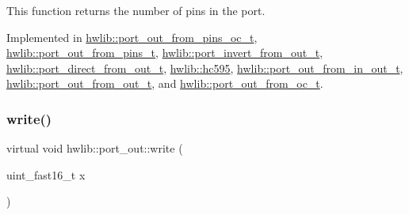 This function returns the number of pins in the port. 

Implemented in \hyperlink{classhwlib_1_1port__out__from__pins__oc__t_adcf78d299959f17d7515f7290206df12}{hwlib\+::port\+\_\+out\+\_\+from\+\_\+pins\+\_\+oc\+\_\+t}, \hyperlink{classhwlib_1_1port__out__from__pins__t_a781f5e1b62a7489f4e048b7314d84ab6}{hwlib\+::port\+\_\+out\+\_\+from\+\_\+pins\+\_\+t}, \hyperlink{classhwlib_1_1port__invert__from__out__t_af0b7be0e09f227190f2cee9c6f43120d}{hwlib\+::port\+\_\+invert\+\_\+from\+\_\+out\+\_\+t}, \hyperlink{classhwlib_1_1port__direct__from__out__t_a3204fe9520fd12fcb155362e22629443}{hwlib\+::port\+\_\+direct\+\_\+from\+\_\+out\+\_\+t}, \hyperlink{classhwlib_1_1hc595_a89c7b21cb99d61c91f764a0fdb7ceb9b}{hwlib\+::hc595}, \hyperlink{classhwlib_1_1port__out__from__in__out__t_a0daa8725e2de27b9071505fa198b4b78}{hwlib\+::port\+\_\+out\+\_\+from\+\_\+in\+\_\+out\+\_\+t}, \hyperlink{classhwlib_1_1port__out__from__out__t_a6e8205f2537103897083612c6d5f35a9}{hwlib\+::port\+\_\+out\+\_\+from\+\_\+out\+\_\+t}, and \hyperlink{classhwlib_1_1port__out__from__oc__t_a25961246ca2c7433fc7534d479a58537}{hwlib\+::port\+\_\+out\+\_\+from\+\_\+oc\+\_\+t}.

\mbox{\label{classhwlib_1_1port__out_a3644bf484ebe059ec5bf17fa43e0c01b}} 
\subsubsection{\texorpdfstring{write()}{write()}}
{\footnotesize\ttfamily virtual void hwlib\+::port\+\_\+out\+::write (\begin{DoxyParamCaption}\item[{uint\+\_\+fast16\+\_\+t}]{x }\end{DoxyParamCaption})\hspace{0.3cm}{\ttfamily [pure virtual]}}







